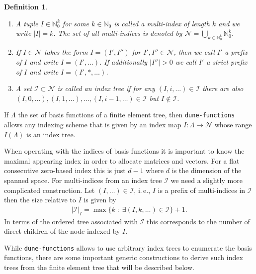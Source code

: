 \documentclass[a4paper,10pt,headings=normal,bibliography=totoc]{scrartcl}
\newtheorem{definition}{Definition}
\newcommand{\N}{\mathbb{N}}
\newcommand{\op}[1]{\operatorname{#1}}
\newcommand{\st}{\; : \;}
\newcommand{\dunemodule}[1]{\texttt{#1}}
\begin{document}
\begin{definition}
    \begin{enumerate}
        \item
            A tuple $I \in \N_0^k$ for some $k \in \N_0$ is called a multi-index of length $k$
            and we write $|I|=k$.
            The set of all multi-indices is denoted by
            $\mathcal{N} = \bigcup_{k \in \N_0^k} \N_0^k$.
        \item
            If $I \in \mathcal{N}$ takes the form $I = (I',I'')$ for $I',I'' \in \mathcal{N}$,
            then we call $I'$ a prefix of $I$ and write $I = (I',\dots)$.
            If additionally $|I''|>0$ we call $I'$ a strict prefix of $I$ and write $I = (I',*,\dots)$.
        \item
            A set $\mathcal{I} \subset \mathcal{N}$ is called an \emph{index tree}
            if for any $(I,i,\dots) \in \mathcal{I}$ there are also $(I,0,\dots),(I,1,\dots),\dots,(I,i-1,\dots) \in \mathcal{I}$
            but $I \notin \mathcal{I}$.
    \end{enumerate}
\end{definition}

If $\Lambda$ the set of basis functions of a finite element tree,
then \dunemodule{dune-functions} allows any indexing scheme that
is given by an index map $I: \Lambda \to \mathcal{N}$
whose range $I(\Lambda)$ is an index tree.

When operating with the indices of basis functions it is important
to know the maximal appearing index in order to allocate matrices
and vectors.
For a flat consecutive zero-based index this is just $d-1$ where
$d$ is the dimension of the spanned space. For multi-indices from
an index tree $\mathcal{I}$ we need a slightly more complicated
construction. Let $(I,\dots) \in \mathcal{I}$, i.\,e., $I$ is a
prefix of multi-indices in $\mathcal{I}$ then the size relative
to $I$ is given by
\begin{align*}
    |\mathcal{I}|_I = \op{max}\{k \st \exists (I,k,\dots) \in \mathcal{I} \}+1.
\end{align*}
In terms of the ordered tree associated with $\mathcal{I}$ this corresponds
to the number of direct children of the node indexed by $I$.


While \dunemodule{dune-functions} allows to use arbitrary index trees
to enumerate the basis functions, there are some important generic constructions
to derive such index trees from the finite element tree that will be described below.
\end{document}
